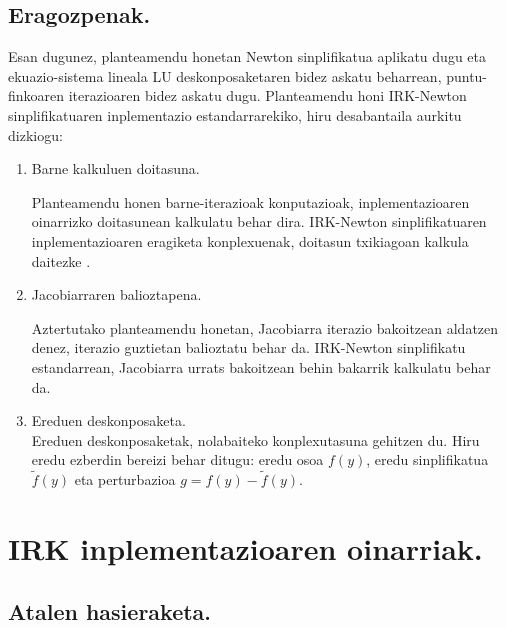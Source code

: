 \subsection*{Eragozpenak.}
Esan dugunez, planteamendu honetan Newton sinplifikatua aplikatu dugu eta ekuazio-sistema lineala LU deskonposaketaren bidez askatu beharrean, puntu-finkoaren iterazioaren bidez askatu dugu. Planteamendu honi IRK-Newton sinplifikatuaren inplementazio estandarrarekiko, hiru desabantaila aurkitu dizkiogu: 
\begin{enumerate}
\item Barne kalkuluen doitasuna. 

Planteamendu honen barne-iterazioak konputazioak, inplementazioaren oinarrizko doitasunean kalkulatu behar dira.
IRK-Newton sinplifikatuaren inplementazioaren eragiketa konplexuenak, doitasun txikiagoan kalkula daitezke \cite{Baboulin20092526}. 

\item Jacobiarraren balioztapena.

Aztertutako planteamendu honetan, Jacobiarra iterazio bakoitzean aldatzen denez, iterazio guztietan balioztatu behar da.
IRK-Newton sinplifikatu estandarrean, Jacobiarra urrats bakoitzean behin bakarrik kalkulatu behar da. 

\item Ereduen deskonposaketa.\\
Ereduen deskonposaketak, nolabaiteko konplexutasuna gehitzen du. Hiru eredu ezberdin bereizi behar ditugu: eredu osoa $f(y)$, eredu sinplifikatua $\tilde{f}(y)$ eta perturbazioa  $g=f(y)-\tilde{f}(y)$. 
\end{enumerate}

\section{IRK inplementazioaren oinarriak.}


\subsection*{Atalen hasieraketa.}


